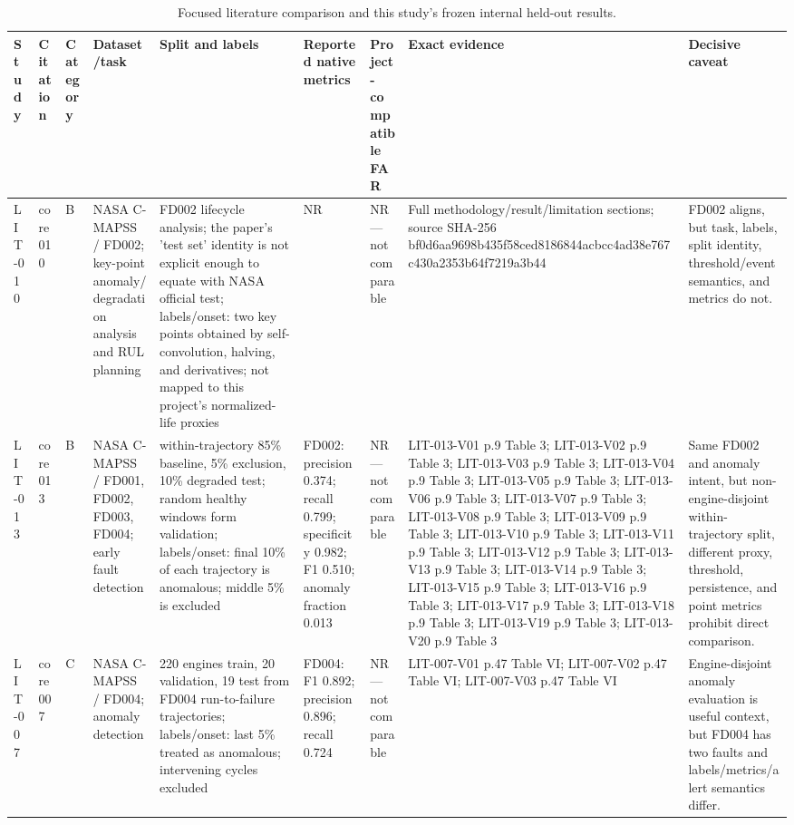 \begin{table}[t]
\centering
\small
\caption{Focused literature comparison and this study's frozen internal held-out results.}
\label{tab:literature-comparison}
\begin{tabular}{p{}p{}p{}p{}p{}p{}p{}p{}p{}}
\hline
Study & Citation & Category & Dataset/task & Split and labels & Reported native metrics & Project-compatible FAR & Exact evidence & Decisive caveat \\
\hline
LIT-010 & core010 & B & NASA C-MAPSS / FD002; key-point anomaly/degradation analysis and RUL planning & FD002 lifecycle analysis; the paper's 'test set' identity is not explicit enough to equate with NASA official test; labels/onset: two key points obtained by self-convolution, halving, and derivatives; not mapped to this project's normalized-life proxies & NR & NR---not comparable & Full methodology/result/limitation sections; source SHA-256 bf0d6aa9698b435f58ced8186844acbcc4ad38e767c430a2353b64f7219a3b44 & FD002 aligns, but task, labels, split identity, threshold/event semantics, and metrics do not. \\
LIT-013 & core013 & B & NASA C-MAPSS / FD001, FD002, FD003, FD004; early fault detection & within-trajectory 85\% baseline, 5\% exclusion, 10\% degraded test; random healthy windows form validation; labels/onset: final 10\% of each trajectory is anomalous; middle 5\% is excluded & FD002: precision 0.374; recall 0.799; specificity 0.982; F1 0.510; anomaly fraction 0.013 & NR---not comparable & LIT-013-V01 p.9 Table 3; LIT-013-V02 p.9 Table 3; LIT-013-V03 p.9 Table 3; LIT-013-V04 p.9 Table 3; LIT-013-V05 p.9 Table 3; LIT-013-V06 p.9 Table 3; LIT-013-V07 p.9 Table 3; LIT-013-V08 p.9 Table 3; LIT-013-V09 p.9 Table 3; LIT-013-V10 p.9 Table 3; LIT-013-V11 p.9 Table 3; LIT-013-V12 p.9 Table 3; LIT-013-V13 p.9 Table 3; LIT-013-V14 p.9 Table 3; LIT-013-V15 p.9 Table 3; LIT-013-V16 p.9 Table 3; LIT-013-V17 p.9 Table 3; LIT-013-V18 p.9 Table 3; LIT-013-V19 p.9 Table 3; LIT-013-V20 p.9 Table 3 & Same FD002 and anomaly intent, but non-engine-disjoint within-trajectory split, different proxy, threshold, persistence, and point metrics prohibit direct comparison. \\
LIT-007 & core007 & C & NASA C-MAPSS / FD004; anomaly detection & 220 engines train, 20 validation, 19 test from FD004 run-to-failure trajectories; labels/onset: last 5\% treated as anomalous; intervening cycles excluded & FD004: F1 0.892; precision 0.896; recall 0.724 & NR---not comparable & LIT-007-V01 p.47 Table VI; LIT-007-V02 p.47 Table VI; LIT-007-V03 p.47 Table VI & Engine-disjoint anomaly evaluation is useful context, but FD004 has two faults and labels/metrics/alert semantics differ. \\

\end{tabular}
\end{table}
